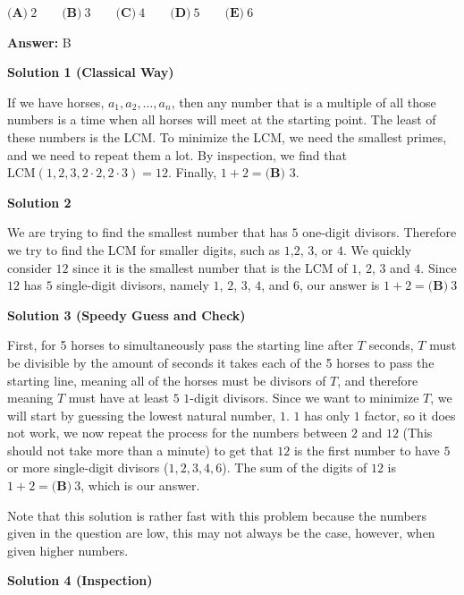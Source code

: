 \begin{enumerate}
 $\textbf{(A)}\ 2\qquad\textbf{(B)}\ 3\qquad\textbf{(C)}\ 4\qquad\textbf{(D)}\ 5\qquad\textbf{(E)}\ 6$

 \textbf{Answer: }B



\textbf{Solution 1 (Classical Way)}

If we have horses, $a_1, a_2, \ldots, a_n$, then any number that is a multiple of all those numbers is a time when all horses will meet at the starting point. The least of these numbers is the LCM. To minimize the LCM, we need the smallest primes, and we need to repeat them a lot. By inspection, we find that $\text{LCM}(1,2,3,2\cdot2,2\cdot3) = 12$. Finally, $1+2 = \boxed{\textbf{(B) }3}$.

 



\textbf{Solution 2}

We are trying to find the smallest number that has $5$ one-digit divisors. Therefore we try to find the LCM for smaller digits, such as $1$,$2$, $3$, or $4$. We quickly consider $12$ since it is the smallest number that is the LCM of $1$, $2$, $3$ and $4$. Since $12$ has $5$ single-digit divisors, namely $1$, $2$, $3$, $4$, and $6$, our answer is $1+2 = \boxed{\textbf{(B)}\ 3}$




\textbf{Solution 3 (Speedy Guess and Check)}

First, for 5 horses to simultaneously pass the starting line after $T$ seconds, $T$ must be divisible by the amount of seconds it takes each of the 5 horses to pass the starting line, meaning all of the horses must be divisors of $T$, and therefore meaning $T$ must have at least $5$ $1$-digit divisors. Since we want to minimize $T$, we will start by guessing the lowest natural number, $1$. $1$ has only $1$ factor, so it does not work, we now repeat the process for the numbers between $2$ and $12$ (This should not take more than a minute) to get that $12$ is the first number to have $5$ or more single-digit divisors ($1, 2, 3, 4, 6$). The sum of the digits of $12$ is $1+2 = \boxed{\textbf{(B)}\ 3}$, which is our answer.

 Note that this solution is rather fast with this problem because the numbers given in the question are low, this may not always be the case, however, when given higher numbers.

 



\textbf{Solution 4 (Inspection)}


\end{enumerate}
